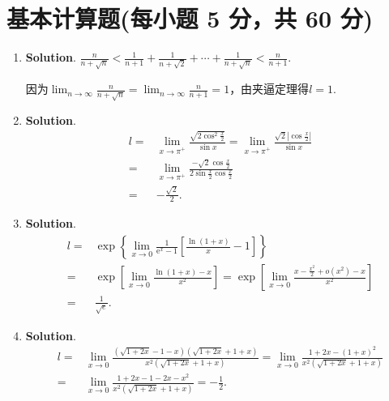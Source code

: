 \documentclass[../Main.tex]{subfiles}
\begin{document}
\section{基本计算题(每小题 5 分，共 60 分)}
\begin{enumerate}
    \item \textbf{Solution}. $\frac{n}{n+\sqrt{n}}<\frac{1}{n+1}+\frac{1}{n+\sqrt{2}}
              +\cdots+\frac{1}{n+\sqrt{n}}<\frac{n}{n+1}$.

          因为$\lim_{n\to\infty}\frac{n}{n+\sqrt{n}}=\lim_{n\to\infty}\frac{n}{n+1}=1$，由夹逼定理得$l
              =1$.

    \item \textbf{Solution}.
          \[
              \begin{aligned}
                  l = & \lim_{x\to \pi^+}\frac{\sqrt{2\cos^2 \frac{x}{2}}}{\sin x}=\lim_{x\to\pi^+}\frac{\sqrt{2}\left|\cos\frac{x}{2}\right|}{\sin x} \\
                  =   & \lim_{x\to\pi^+}\frac{-\sqrt{2}\cos\frac{x}{2}}{2\sin \frac{x}{2}\cos \frac{x}{2}}                                             \\
                  =   & -\frac{\sqrt{2}}{2}.
              \end{aligned}
          \]

    \item \textbf{Solution}.
          \[
              \begin{aligned}
                  l= & \exp\left\{\lim_{x\to0}\frac{1}{\mathrm{e}^x-1}\left[\frac{\ln(1+x)}{x}-1\right]\right\}                              \\
                  =  & \exp\left[\lim_{x\to0}\frac{\ln(1+x)-x}{x^2}\right]=\exp\left[\lim_{x\to0}\frac{x-\frac{x^2}{2}+o(x^2)-x}{x^2}\right] \\
                  =  & \frac{1}{\sqrt{e}}.
              \end{aligned}
          \]

    \item \textbf{Solution}.
          \[
              \begin{aligned}
                  l = & \lim_{x\to0}\frac{\left(\sqrt{1+2x}-1-x\right)\left(\sqrt{1+2x}+1+x\right)}{x^2\left(\sqrt{1+2x}+1+x\right)}=\lim_{x\to0}\frac{1+2x-(1+x)^2}{x^2\left(\sqrt{1+2x}+1+x\right)} \\
                  =   & \lim_{x\to0}\frac{1+2x-1-2x-x^2}{x^2\left(\sqrt{1+2x}+1+x\right)}=-\frac{1}{2}.
              \end{aligned}
          \]


\end{enumerate}
\end{document}
